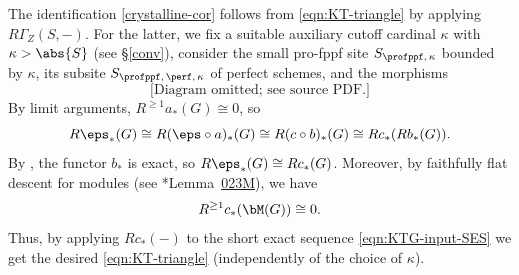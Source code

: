 \bpf
The identification \eqref{crystalline-cor} follows from \eqref{eqn:KT-triangle} by applying $R\Gamma_Z(S, -)$. For the latter, we fix a suitable auxiliary %
cutoff cardinal $\kappa$ with
$\kappa > \abs{S}$ (see \S\ref{conv}), consider the small pro-fppf site $S_{\profppf,\, \kappa}$ bounded by $\kappa$, its subsite $S_{\profppf,\, \perf,\, \kappa}$ of perfect schemes, and the morphisms
\[
\text{[Diagram omitted; see source PDF.]}
\]
By limit arguments, %
$R^{\ge 1}a_*(G) \cong 0$, so
\[
R\eps_*(G) \cong R(\eps \circ a)_*(G) \cong R(c \circ b)_*(G) \cong Rc_*(Rb_*(G)).
\]
By , the functor $b_*$ is exact, so $R\eps_*(G) \cong Rc_*(G)$. Moreover, by %
faithfully flat descent for modules (see \cite{SP}*{Lemma~\href{https://stacks.math.columbia.edu/tag/023M}{023M}}), we have
\[
R^{\ge 1}c_*(\bM(G)) \cong 0.
\]
Thus, by applying $Rc_*(-)$ to the short exact sequence \eqref{eqn:KTG-input-SES} we get the desired \eqref{eqn:KT-triangle} (independently of the choice of $\kappa$). %
\epf








